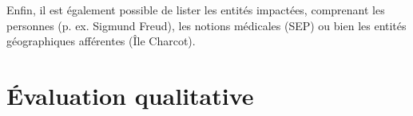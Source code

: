
Enfin, il est également possible de lister les entités impactées, comprenant les personnes (p. ex. Sigmund Freud), les notions médicales (SEP) ou bien les entités géographiques afférentes (Île Charcot).

\section{Évaluation qualitative}
\label{sect:eval_quali}
